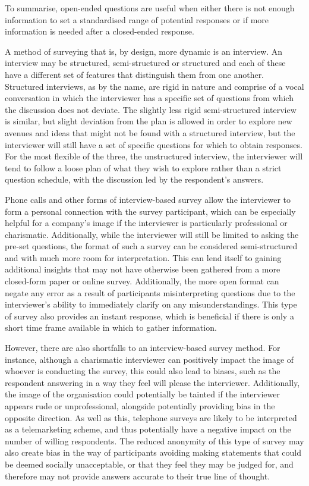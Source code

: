 \documentclass[
  11pt,
]{book}
\begin{document}
To summarise, open-ended questions are useful when either there is not
enough information to set a standardised range of potential responses or
if more information is needed after a closed-ended response.

A method of surveying that is, by design, more dynamic is an interview.
An interview may be structured, semi-structured or structured and each
of these have a different set of features that distinguish them from one
another. Structured interviews, as by the name, are rigid in nature and
comprise of a vocal conversation in which the interviewer has a specific
set of questions from which the discussion does not deviate. The
slightly less rigid semi-structured interview is similar, but slight
deviation from the plan is allowed in order to explore new avenues and
ideas that might not be found with a structured interview, but the
interviewer will still have a set of specific questions for which to
obtain responses. For the most flexible of the three, the unstructured
interview, the interviewer will tend to follow a loose plan of what they
wish to explore rather than a strict question schedule, with the
discussion led by the respondent's answers.

Phone calls and other forms of interview-based survey allow the
interviewer to form a personal connection with the survey participant,
which can be especially helpful for a company's image if the interviewer
is particularly professional or charismatic. Additionally, while the
interviewer will still be limited to asking the pre-set questions, the
format of such a survey can be considered semi-structured and with much
more room for interpretation. This can lend itself to gaining additional
insights that may not have otherwise been gathered from a more
closed-form paper or online survey. Additionally, the more open format
can negate any error as a result of participants misinterpreting
questions due to the interviewer's ability to immediately clarify on any
misunderstandings. This type of survey also provides an instant
response, which is beneficial if there is only a short time frame
available in which to gather information.

However, there are also shortfalls to an interview-based survey method.
For instance, although a charismatic interviewer can positively impact
the image of whoever is conducting the survey, this could also lead to
biases, such as the respondent answering in a way they feel will please
the interviewer. Additionally, the image of the organisation could
potentially be tainted if the interviewer appears rude or
unprofessional, alongside potentially providing bias in the opposite
direction. As well as this, telephone surveys are likely to be
interpreted as a telemarketing scheme, and thus potentially have a
negative impact on the number of willing respondents. The reduced
anonymity of this type of survey may also create bias in the way of
participants avoiding making statements that could be deemed socially
unacceptable, or that they feel they may be judged for, and therefore
may not provide answers accurate to their true line of thought.
\end{document}
